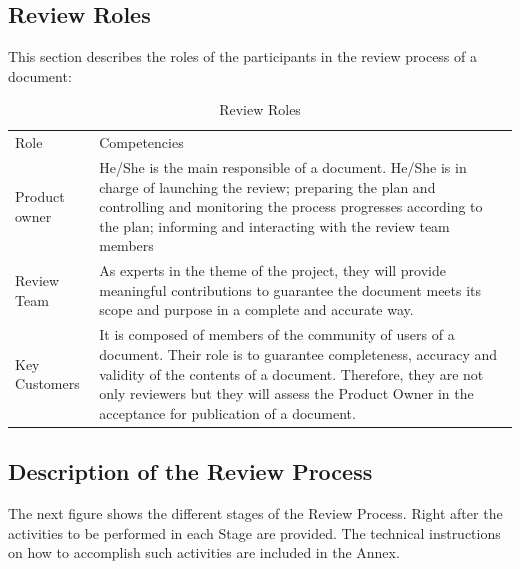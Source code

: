 \documentclass{template/openetcs_article}
\begin{document}
\subsection{Review Roles}

This section describes the roles of the participants in the review process of a document:

\begin{table}[H]
\begin{tabular}{|m{3cm}|m{11cm}|}
\hline
\rowcolor{myblue}
\multicolumn{2}{|c|}{Roles} \\\hline
\rowcolor{lightgray}
Role &
Competencies \\\hline
Product owner &
He/She is the main responsible of a document. He/She is in charge of launching the review; preparing the plan and controlling and monitoring the process progresses according to the plan; informing and interacting with the review team members \\\hline
Review Team &
As experts in the theme of the project, they will provide meaningful contributions to guarantee the document meets its scope and purpose in a complete and accurate way.\\\hline
Key Customers  &
It is composed of members of the community of users of a document. Their role is to guarantee completeness, accuracy and validity of the contents of a document. Therefore, they are not only reviewers but they will assess the Product Owner in the acceptance for publication of a document. \\\hline
\end{tabular}
\caption{Review Roles}
\end{table}

\subsection{Description of the Review Process}

The next figure shows the different stages of the Review Process. Right after the activities to be performed in each Stage are provided. The technical instructions on how to accomplish such activities are included in the Annex.
\end{document}
